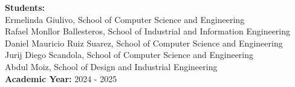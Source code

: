 \begin{titlepage}
\begin{center}
       \vspace{1cm}
       
       \begin{flushleft}
           {\large \textbf{Students:}} \\
           Ermelinda Giulivo, School of Computer Science and Engineering \\
           Rafael Monllor Ballesteros, School of Industrial and Information Engineering \\
           Daniel Mauricio Ruiz Suarez, School of Computer Science and Engineering \\
           Jurij Diego Scandola, School of Computer Science and Engineering \\
           Abdul Moiz, School of Design and Industrial Engineering \\
           \vspace{1cm}
           \textbf{Academic Year:} 2024 - 2025 \\
       \end{flushleft}
   \end{center}


\end{titlepage}

